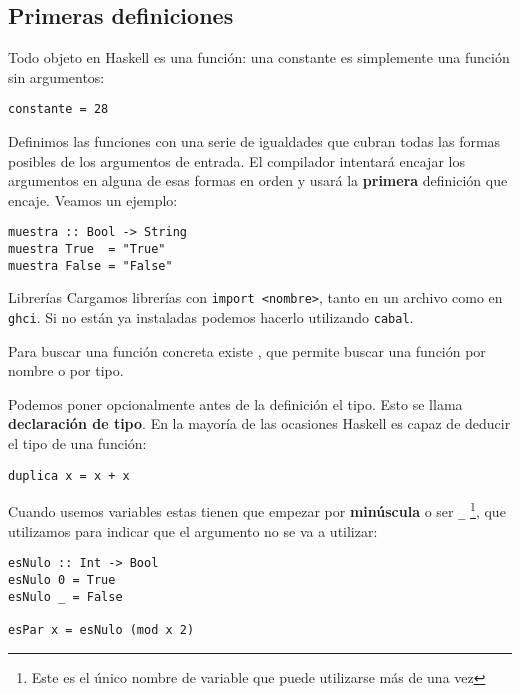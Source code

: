 \subsection{Primeras definiciones}

Todo objeto en Haskell es una función: una constante es simplemente una función
sin argumentos:

\begin{lstlisting}
constante = 28
\end{lstlisting}

Definimos las funciones con una serie de igualdades que cubran todas las formas
posibles de los argumentos de entrada. El compilador intentará encajar los
argumentos en alguna de esas formas en orden y usará la \textbf{primera}
definición que encaje. Veamos un ejemplo:

\begin{lstlisting}
muestra :: Bool -> String
muestra True  = "True"
muestra False = "False"
\end{lstlisting}

\begin{extra}{Librerías}
Cargamos librerías con \texttt{import <nombre>}, tanto en un archivo como en
\texttt{ghci}. Si no están ya instaladas podemos hacerlo utilizando
\texttt{cabal}.

\espacio

Para buscar una función concreta existe ,
que permite buscar una función por nombre o por tipo.
\end{extra}

Podemos poner opcionalmente antes de la definición el tipo. Esto se llama
\textbf{declaración de tipo}. En la mayoría de las ocasiones Haskell es capaz
de deducir el tipo de una función:

\begin{lstlisting}
duplica x = x + x
\end{lstlisting}

Cuando usemos variables estas tienen que empezar por \textbf{minúscula} o ser
\texttt{\_} \footnote{Este es el único nombre de variable que puede utilizarse
más de una vez}, que utilizamos para indicar que el argumento no se va a utilizar:

\begin{lstlisting}
esNulo :: Int -> Bool
esNulo 0 = True
esNulo _ = False

esPar x = esNulo (mod x 2)
\end{lstlisting}


